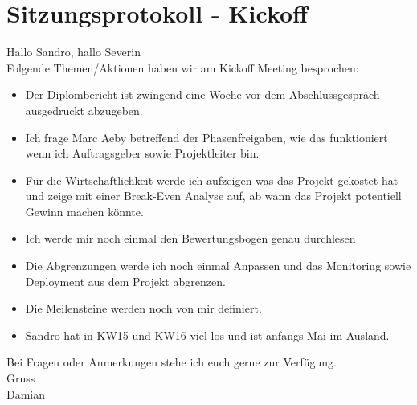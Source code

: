 \chapter{Sitzungsprotokoll - Kickoff}

Hallo Sandro, hallo Severin\\

\noindent
Folgende Themen/Aktionen haben wir am Kickoff Meeting besprochen:

\begin{itemize}
  \item
    Der Diplombericht ist zwingend eine Woche vor dem Abschlussgespräch
    ausgedruckt abzugeben.
  \item
    Ich frage Marc Aeby betreffend der Phasenfreigaben,
    wie das funktioniert wenn ich Auftragsgeber sowie
    Projektleiter bin.
  \item
    Für die Wirtschaftlichkeit werde ich aufzeigen was das
    Projekt gekostet hat und zeige mit einer Break-Even Analyse
    auf, ab wann das Projekt potentiell Gewinn machen könnte.

  \item
    Ich werde mir noch einmal den Bewertungsbogen genau
    durchlesen

  \item
    Die Abgrenzungen werde ich noch einmal Anpassen und das
    Monitoring sowie Deployment aus dem Projekt abgrenzen.

  \item
    Die Meilensteine werden noch von mir definiert.

  \item
    Sandro hat in KW15 und KW16 viel los und ist anfangs Mai im
    Ausland.
\end{itemize}

\noindent
Bei Fragen oder Anmerkungen stehe ich euch gerne zur Verfügung.\\

\noindent
Gruss\\
Damian
